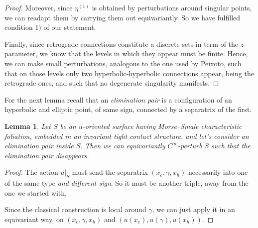 \documentclass[a4paper, 11pt]{amsart}
\theoremstyle{plain}
\newtheorem{lemma}[lemma]{Lemma}
\theoremstyle{definition}
\begin{document}
\begin{proof}
	Moreover, since $\eta^{(1)}$ is obtained by perturbations around singular points, we can readapt them by carrying them out equivariantly. So we have fulfilled condition $1)$ of our statement.
	
	Finally, since retrograde connections constitute a discrete sets in term of the $z$-parameter, we know that the levels in which they appear must be finite. Hence, we can make small perturbations, analogous to the one used by Peixoto, such that on those levels only two hyperbolic-hyperbolic connections appear, being the retrograde ones, and such that no degenerate singularity manifests.
\end{proof}

For the next lemma recall that an \emph{elimination pair} is a configuration of an hyperbolic and elliptic point, of same sign, connected by a separatrix of the first.
\begin{lemma}
	Let $S$ be an $u$-oriented surface having Morse--Smale characteristic foliation, embedded in an invariant tight contact structure, and let's consider an elimination pair inside $S$. Then we can equivariantly $C^\infty$-perturb $S$ such that the elimination pair disappears.
\end{lemma}
\begin{proof}
	The action $u|_S$ must send the separatrix $(x_e, \gamma, x_h)$ necessarily into one of the same type \emph{and different sign}. So it must be another triple, away from the one we started with.
	
	Since the classical construction \cite[Lemma 4.6.26]{geigesIntroductionContactTopology2008} is local around $\gamma$, we can just apply it in an equivariant way, on $(x_e, \gamma, x_h)$ and $(u(x_e), u(\gamma), u(x_h))$.
\end{proof}
\end{document}
